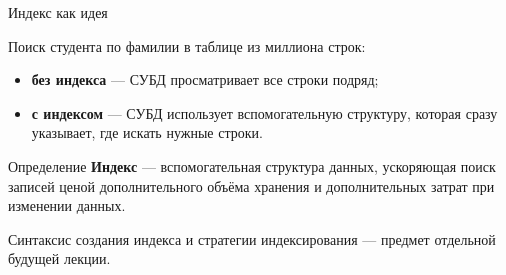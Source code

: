 \documentclass[aspectratio=169]{beamer}
\begin{document}
\begin{frame}{Индекс как идея}

Поиск студента по фамилии в таблице из миллиона строк:

\vspace{0.3cm}

\begin{itemize}
  \item \textbf{без индекса} — СУБД просматривает
        все строки подряд;
  \item \textbf{с индексом} — СУБД использует
        вспомогательную структуру, которая сразу указывает,
        где искать нужные строки.
\end{itemize}

\vspace{0.4cm}

\begin{block}{Определение}
\textbf{Индекс} — вспомогательная структура данных,
ускоряющая поиск записей ценой дополнительного
объёма хранения и дополнительных затрат при изменении
данных.
\end{block}

\vspace{0.2cm}
\footnotesize
Синтаксис создания индекса и стратегии индексирования —
предмет отдельной будущей лекции.

\end{frame}


\end{document}
